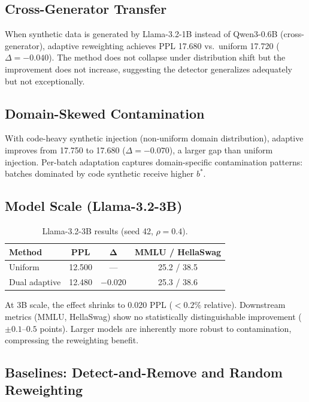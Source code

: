 \documentclass[11pt]{article}
\begin{document}
\subsection{Cross-Generator Transfer}

When synthetic data is generated by Llama-3.2-1B instead of Qwen3-0.6B (cross-generator), adaptive reweighting achieves PPL 17.680 vs.\ uniform 17.720 ($\Delta = -0.040$). The method does not collapse under distribution shift but the improvement does not increase, suggesting the detector generalizes adequately but not exceptionally.

\subsection{Domain-Skewed Contamination}

With code-heavy synthetic injection (non-uniform domain distribution), adaptive improves from 17.750 to 17.680 ($\Delta = -0.070$), a larger gap than uniform injection. Per-batch adaptation captures domain-specific contamination patterns: batches dominated by code synthetic receive higher $b^*$.

\subsection{Model Scale (Llama-3.2-3B)}

\begin{table}[h]
\centering
\caption{Llama-3.2-3B results (seed 42, $\rho = 0.4$).}
\label{tab:llama}
\begin{tabular}{lccc}
\toprule
\textbf{Method} & \textbf{PPL} & $\boldsymbol{\Delta}$ & \textbf{MMLU / HellaSwag} \\
\midrule
Uniform & 12.500 & --- & 25.2 / 38.5 \\
Dual adaptive & 12.480 & $-0.020$ & 25.3 / 38.6 \\
\bottomrule
\end{tabular}
\end{table}

At 3B scale, the effect shrinks to 0.020 PPL ($< 0.2\%$ relative). Downstream metrics (MMLU, HellaSwag) show no statistically distinguishable improvement ($\pm 0.1$--$0.5$ points). Larger models are inherently more robust to contamination, compressing the reweighting benefit.

\subsection{Baselines: Detect-and-Remove and Random Reweighting}
\end{document}
